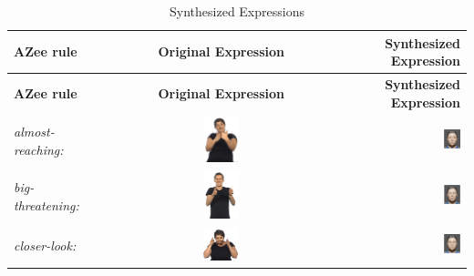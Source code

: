 \documentclass[../../main]{subfiles}
\begin{document}
\begin{longtable}{|l|c|r|}
    \caption{Synthesized Expressions} \label{tab:facial_expressions} \\
    \hline
    \textbf{AZee rule} & \textbf{Original Expression} & \textbf{Synthesized Expression} \\
    \hline
    \endfirsthead

    \hline
    \textbf{AZee rule} & \textbf{Original Expression} & \textbf{Synthesized Expression} \\
    \hline
    \endhead

    \hline
    \endfoot

    \hline
    \endlastfoot

    \emph{almost-reaching:} & \includegraphics[width=0.15\textwidth]{chapters/facial_expressions/images/original_facial_expressions/almost_reaching.png} & \includegraphics[width=0.15\textwidth]{chapters/facial_expressions/images/synthesized_expressions/almost_reaching.png} \\
    \emph{big-threatening:} & \includegraphics[width=0.15\textwidth]{chapters/facial_expressions/images/original_facial_expressions/big_threatening.png} & \includegraphics[width=0.15\textwidth]{chapters/facial_expressions/images/synthesized_expressions/big_threatening.png} \\
    \emph{closer-look:} & \includegraphics[width=0.15\textwidth]{chapters/facial_expressions/images/original_facial_expressions/closer_look.png} & \includegraphics[width=0.15\textwidth]{chapters/facial_expressions/images/synthesized_expressions/closer_look.png} \\

\end{longtable}
\end{document}
